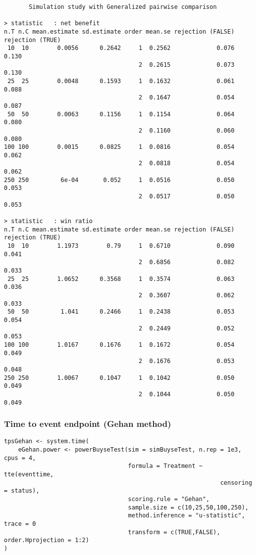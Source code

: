 \documentclass[12pt]{article}
\begin{document}
\begin{verbatim}
       Simulation study with Generalized pairwise comparison

> statistic   : net benefit
n.T n.C mean.estimate sd.estimate order mean.se rejection (FALSE) rejection (TRUE)
 10  10        0.0056      0.2642     1  0.2562             0.076            0.130
                                      2  0.2615             0.073            0.130
 25  25        0.0048      0.1593     1  0.1632             0.061            0.088
                                      2  0.1647             0.054            0.087
 50  50        0.0063      0.1156     1  0.1154             0.064            0.080
                                      2  0.1160             0.060            0.080
100 100        0.0015      0.0825     1  0.0816             0.054            0.062
                                      2  0.0818             0.054            0.062
250 250         6e-04       0.052     1  0.0516             0.050            0.053
                                      2  0.0517             0.050            0.053

> statistic   : win ratio
n.T n.C mean.estimate sd.estimate order mean.se rejection (FALSE) rejection (TRUE)
 10  10        1.1973        0.79     1  0.6710             0.090            0.041
                                      2  0.6856             0.082            0.033
 25  25        1.0652      0.3568     1  0.3574             0.063            0.036
                                      2  0.3607             0.062            0.033
 50  50         1.041      0.2466     1  0.2438             0.053            0.054
                                      2  0.2449             0.052            0.053
100 100        1.0167      0.1676     1  0.1672             0.054            0.049
                                      2  0.1676             0.053            0.048
250 250        1.0067      0.1047     1  0.1042             0.050            0.049
                                      2  0.1044             0.050            0.049
\end{verbatim}

\clearpage

\subsubsection{Time to event endpoint (Gehan method)}
\label{sec:org0fc555e}
\lstset{language=r,label= ,caption= ,captionpos=b,numbers=none}
\begin{lstlisting}
tpsGehan <- system.time(
	eGehan.power <- powerBuyseTest(sim = simBuyseTest, n.rep = 1e3, cpus = 4,
								   formula = Treatment ~ tte(eventtime, 
															 censoring = status), 
								   scoring.rule = "Gehan",
								   sample.size = c(10,25,50,100,250), 
								   method.inference = "u-statistic", trace = 0
								   transform = c(TRUE,FALSE), order.Hprojection = 1:2)
)
\end{lstlisting}
\end{document}
